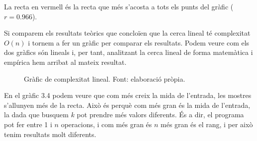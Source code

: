 La recta en vermell és la recta que més s'acosta a tots els punts del gràfic ($r = 0.966$).

Si comparem els resultats teòrics que concloïen que la cerca lineal té complexitat $O(n)$ i tornem a fer un gràfic per comparar els resultats. Podem veure com els dos gràfics són lineals i, per tant, analitzant la cerca lineal de forma matemàtica i empírica hem arribat al mateix resultat.
\begin{figure}[H]
\centering
{}
    \caption[Gràfic de complexitat lineal.]{Gràfic de complexitat lineal. Font: elaboració pròpia.}
    \label{fig:my_label}
\end{figure}
\vspace{-18pt}
En el gràfic 3.4 podem veure que com més creix la mida de l'entrada, les mostres s'allunyen més de la recta. Això és perquè com més gran és la mida de l'entrada, la dada que busquem $k$ pot prendre més valors diferents. És a dir, el programa pot fer entre 1 i $n$ operacions, i com més gran és $n$ més gran és el rang, i per això tenim resultats molt diferents. 


